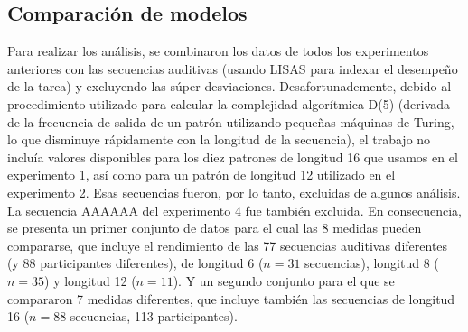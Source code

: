
 \subsection{Comparación de modelos}
 
 
 Para realizar los análisis, se combinaron los datos de todos los experimentos anteriores con las secuencias auditivas (usando LISAS para indexar el desempeño de la tarea) y excluyendo las súper-desviaciones. Desafortunademente, debido al procedimiento utilizado para calcular la complejidad algorítmica D(5) (derivada de la frecuencia de salida de un patrón utilizando pequeñas máquinas de Turing, lo que disminuye rápidamente con la longitud de la secuencia), el trabajo no incluía valores disponibles para los diez patrones de longitud 16 que usamos en el experimento 1, así como para un patrón de longitud 12 utilizado en el experimento 2. Esas secuencias fueron, por lo tanto, excluidas de algunos análisis. La secuencia AAAAAA del experimento 4 fue también excluida. En consecuencia, se presenta un primer conjunto de datos para el cual las 8 medidas pueden compararse, que incluye el rendimiento de las 77 secuencias auditivas diferentes (y 88 participantes diferentes), de longitud 6 ($n = 31$ secuencias), longitud 8 ($n = 35$) y longitud 12 ($n= 11$). Y un segundo conjunto para el que se compararon 7 medidas diferentes, que incluye también las secuencias de longitud 16 ($n = 88$ secuencias, 113 participantes).
 
